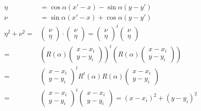 \documentclass[a4paper,12pt]{article}
\begin{document}
\begin{enumerate}
\begin{align}
  \eta&=\cos\alpha (x'-x)- \sin \alpha (y-y')\\
\nu&=\sin \alpha(x'-x)+\cos \alpha (y-y')\\
\eta^2+\nu^2=&\left(\begin{array}{c}
     \nu \\
      \eta
    \end{array}\right) \cdot \left(\begin{array}{c}
     \nu \\
      \eta
    \end{array}\right)=\left(\begin{array}{c}
     \nu \\
      \eta
    \end{array}\right)^t \left(\begin{array}{c}
     \nu \\
      \eta
    \end{array}\right)\\
=&\left(R(\alpha)\left(\begin{array}{c}
     x-x_i \\
     y-y_i
    \end{array}\right)\right)^t \left(R(\alpha)\left(\begin{array}{c}
     x-x_i \\
     y-y_i
    \end{array}\right)\right)\\
=& \left(\begin{array}{c}
     x-x_i \\
     y-y_i
    \end{array}\right)^t R^t(\alpha)R(\alpha)\left(\begin{array}{c}
     x-x_i \\
     y-y_i
    \end{array}\right)\\
=&\left(\begin{array}{c}
     x-x_i \\
     y-y_i
    \end{array}\right)^t \left(\begin{array}{c}
     x-x_i \\
     y-y_i
    \end{array}\right)=(x-x_i)^2+(y-y_i)^2 \label{kesamaanJarak}
\end{align}


\end{enumerate}
\end{document}
